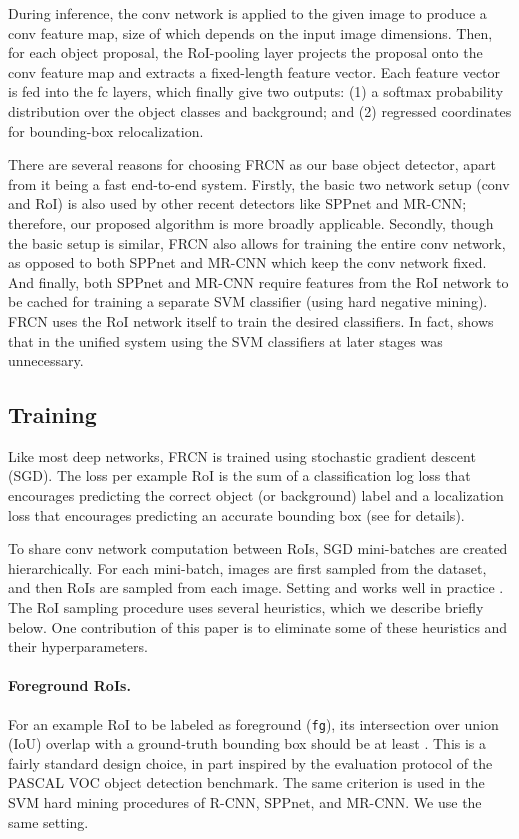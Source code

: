 \documentclass[10pt,twocolumn,letterpaper]{article}
\begin{document}
During inference, the conv network is applied to the given image to produce a conv feature map, size of which depends on the input image dimensions. Then, for each object proposal, the RoI-pooling layer projects the proposal onto the conv feature map and extracts a fixed-length feature vector. Each feature vector is fed into the fc layers, which finally give two outputs: (1) a softmax probability distribution over the object classes and background; and (2) regressed coordinates for bounding-box relocalization.

There are several reasons for choosing FRCN as our base object detector, apart from it being a fast end-to-end system. Firstly, the basic two network setup (conv and RoI) is also used by other recent detectors like SPPnet and MR-CNN; therefore, our proposed algorithm is more broadly applicable. Secondly, though the basic setup is similar, FRCN also allows for training the entire conv network, as opposed to both SPPnet and MR-CNN which keep the conv network fixed. And finally, both SPPnet and MR-CNN require features from the RoI network to be cached for training a separate SVM classifier (using hard negative mining). FRCN uses the RoI network itself to train the desired classifiers. In fact, \cite{frcn} shows that in the unified system using the SVM classifiers at later stages was unnecessary.





\subsection{Training}\label{sec:mini}
Like most deep networks, FRCN is trained using stochastic gradient descent (SGD). The loss per example RoI is the sum of a classification log loss that encourages predicting the correct object (or background) label and a localization loss that encourages predicting an accurate bounding box (see \cite{frcn} for details).

To share conv network computation between RoIs, SGD mini-batches are created hierarchically. For each mini-batch,  images are first sampled from the dataset, and then  RoIs are sampled from each image. Setting  and  works well in practice \cite{frcn}. The RoI sampling procedure uses several heuristics, which we describe briefly below.
One contribution of this paper is to eliminate some of these heuristics and their hyperparameters.

\vspace{-0.1in}
\paragraph{Foreground RoIs.} For an example RoI to be labeled as foreground (\texttt{fg}), its intersection over union (IoU) overlap with a ground-truth bounding box should be at least . This is a fairly standard design choice, in part inspired by the evaluation protocol of the PASCAL VOC object detection benchmark. The same criterion is used in the SVM hard mining procedures of R-CNN, SPPnet, and MR-CNN. We use the same setting.
\end{document}
